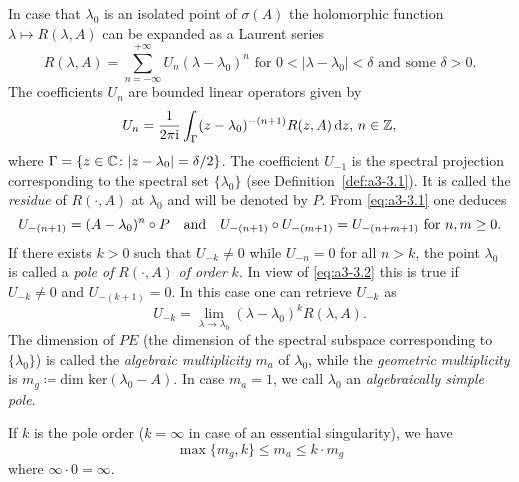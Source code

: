 \begin{example}\label{ex:a3-3.6}%

In case that $\lambda_{0}$ is an isolated point of $\sigma(A)$ the holomorphic function $\lambda \mapsto R(\lambda,A)$ can be expanded as a Laurent series
\[
R(\lambda,A) = \sum_{n=-\infty}^{+\infty} U_{n}(\lambda - \lambda_{0})^{n} \text{ for } 0 < |\lambda - \lambda_{0}| < \delta \text{ and some } \delta > 0 .
\]
The coefficients $U_{n}$ are bounded linear operators given by
\begin{equation}\label{eq:a3-3.1}
	U_{n} = \frac{1}{2\pi\mathrm{i} }\int_{\Gamma} (z - \lambda_{0})^{-(n+1)}R(z,A)  \mathop{}\!\mathrm{d}{z}, \, n \in \mathbb{Z} ,
\end{equation}
where $\Gamma = \{z \in \mathbb{C} \colon |z - \lambda_{0}| = \delta/2\}$.
The coefficient $U_{-1}$ is the spectral projection corresponding to the spectral set $\{\lambda_{0}\}$ (see Definition~\ref{def:a3-3.1}).
It is called the \emph{residue} of $R(\cdot,A)$ at $\lambda_{0}$ and will be denoted by $P$.
From \eqref{eq:a3-3.1} one deduces
\begin{equation}\label{eq:a3-3.2}
U_{-(n+1)} = (A - \lambda_{0})^{n} \circ P \quad \text{and} \quad U_{-(n+1)} \circ U_{-(m+1)} = U_{-(n+m+1)} \text{ for } n, m \geq 0 . \notag
\end{equation}
If there exists $k > 0$ such that $U_{-k} \neq 0$ while $U_{-n} = 0$ for all $n > k$, the point $\lambda_{0}$ is called a \emph{pole of} $R(\cdot,A)$ \emph{of order} $k$.
In view of \eqref{eq:a3-3.2} this is true if $U_{-k} \neq 0$ and $U_{-(k+1)} = 0$.
In this case one can retrieve $U_{-k}$ as
\begin{equation}\label{eq:a3-3.3}
U_{-k} = \lim_{\lambda \to \lambda_{0}} (\lambda - \lambda_{0})^{k}R(\lambda,A) .
\end{equation}
The dimension of $PE$ (\ie the dimension of the spectral subspace corresponding to $\{\lambda_{0}\}$) is called the \emph{algebraic multiplicity} $m_{a}$ of $\lambda_{0}$, while the \emph{geometric multiplicity} is $m_{g} \coloneqq \text{dim ker}(\lambda_{0} - A)$.
In case $m_{a} = 1$, we call $\lambda_{0}$ an \emph{algebraically simple pole}.

If $k$ is the pole order ($k = \infty$ in case of an essential singularity), we have
\begin{equation}\label{eq:a3-3.4}
	\max\{m_{g},k\} \leq m_{a} \leq k \cdot m_{g}
\end{equation}
where $\infty \cdot 0 = \infty$.


\end{example}
